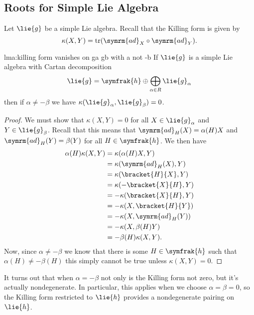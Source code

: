 \documentclass[fleqn]{NotesClass}
\DeclareMathOperator{\tr}{tr}
\newcommand{\ad}{\symrm{ad}}
\newcommand{\csa}{\symfrak{h}}
\begin{document}
    \subsection{Roots for Simple Lie Algebra}
    Let \(\lie{g}\) be a simple Lie algebra.
    Recall that the Killing form is given by
    \begin{equation}
        \kappa(X, Y) = \tr(\ad_X \circ \ad_Y).
    \end{equation}
    
    \begin{lma}{}{lma:killing form vanishes on ga gb with a not -b}
        If \(\lie{g}\) is a simple Lie algebra with Cartan decomposition
        \begin{equation}
            \lie{g} = \csa \oplus \bigoplus_{\alpha \in R} \lie{g}_{\alpha}
        \end{equation}
        then if \(\alpha \ne -\beta\) we have \(\kappa(\lie{g}_\alpha, \lie{g}_\beta) = 0\).
        \begin{proof}
            We must show that \(\kappa(X, Y) = 0\) for all \(X \in \lie{g}_\alpha\) and \(Y \in \lie{g}_\beta\).
            Recall that this means that \(\ad_H(X) = \alpha(H)X\) and \(\ad_H(Y) = \beta(Y)\) for all \(H \in \csa\).
            We then have
            \begin{align}
                \alpha(H) \kappa(X, Y) &= \kappa(\alpha(H) X, Y)\\
                &= \kappa(\ad_H(X), Y)\\
                &= \kappa(\bracket{H}{X}, Y)\\
                &= \kappa(-\bracket{X}{H}, Y)\\
                &= -\kappa(\bracket{X}{H}, Y)\\
                &= -\kappa(X, \bracket{H}{Y})\\
                &= -\kappa(X, \ad_H(Y))\\
                &= -\kappa(X, \beta(H)Y)\\
                &= -\beta(H)\kappa(X, Y).
            \end{align}
            Now, since \(\alpha \ne -\beta\) we know that there is some \(H \in \csa\) such that \(\alpha(H) \ne -\beta(H)\) this simply cannot be true unless \(\kappa(X, Y) = 0\).
        \end{proof}
    \end{lma}
    
    It turns out that when \(\alpha = -\beta\) not only is the Killing form not zero, but it's actually nondegenerate.
    In particular, this applies when we choose \(\alpha = \beta = 0\), so the Killing form restricted to \(\lie{h}\) provides a nondegenerate pairing on \(\lie{h}\).
    
\end{document}

